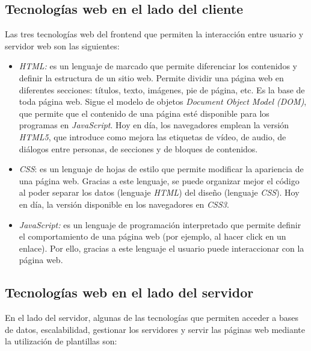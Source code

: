 \subsection{Tecnologías web en el lado del cliente}
Las tres tecnologías web del frontend que permiten la interacción entre usuario y servidor web son las siguientes:
\begin{itemize}
    \item \textit{HTML:} es un lenguaje de marcado que permite diferenciar los contenidos y definir la estructura de un sitio web. Permite dividir una página web en diferentes secciones: títulos, texto, imágenes, pie de página, etc. Es la base de toda página web. Sigue el modelo de objetos \textit{Document Object Model (DOM)}, que permite que el contenido de una página esté disponible para los programas en \textit{JavaScript}. Hoy en día, los navegadores emplean la versión \textit{HTML5}, que introduce como mejora las etiquetas de vídeo, de audio, de diálogos entre personas, de secciones y de bloques de contenidos.
    \item \textit{CSS}: es un lenguaje de hojas de estilo que permite modificar la apariencia de una página web. Gracias a este lenguaje, se puede organizar mejor el código al poder separar los datos (lenguaje \textit{HTML}) del diseño (lenguaje \textit{CSS}). Hoy en día, la versión disponible en los navegadores en \textit{CSS3}.
    \item \textit{JavaScript:} es un lenguaje de programación interpretado que permite definir el comportamiento de una página web (por ejemplo, al hacer click en un enlace). Por ello, gracias a este lenguaje el usuario puede interaccionar con la página web.
\end{itemize}

\subsection{Tecnologías web en el lado del servidor}
En el lado del servidor, algunas de las tecnologías que permiten acceder a bases de datos, escalabilidad, gestionar los servidores y servir las páginas web mediante la utilización de plantillas son:

